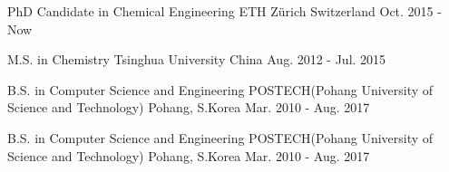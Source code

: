 

\begin{cventries}
\cventry
{PhD Candidate in Chemical Engineering} %
{ETH Z\"{u}rich} %
{Switzerland} %
{Oct. 2015 - Now} %
{
}

\cventry
{M.S. in Chemistry} %
{Tsinghua University} %
{China} %
{Aug. 2012 - Jul. 2015} %
{
}
   
 \cventry
    {B.S. in Computer Science and Engineering} %
    {POSTECH(Pohang University of Science and Technology)} %
    {Pohang, S.Korea} %
    {Mar. 2010 - Aug. 2017} %
    {
    }

     \cventry
    {B.S. in Computer Science and Engineering} %
    {POSTECH(Pohang University of Science and Technology)} %
    {Pohang, S.Korea} %
    {Mar. 2010 - Aug. 2017} %
    {
    }
\end{cventries}
